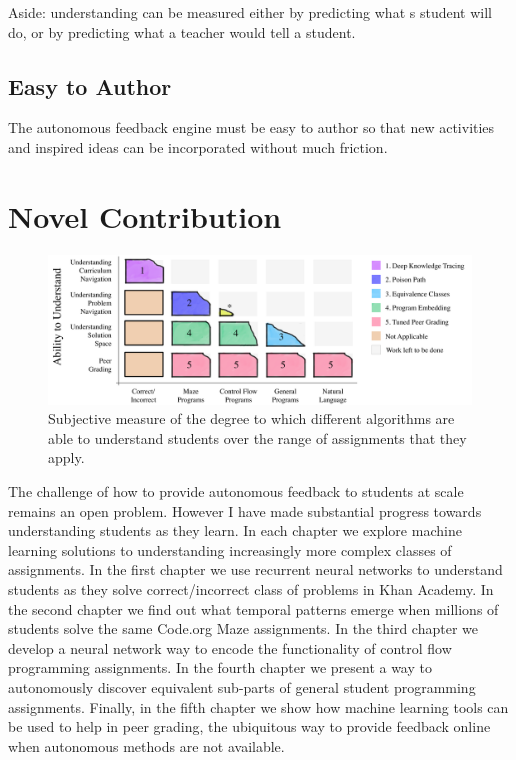 Aside: understanding can be measured either by predicting what s student will do, or by predicting what a teacher would tell a student.

\subsection{Easy to Author}

The autonomous feedback engine must be easy to author so that new activities and inspired ideas can be incorporated without much friction.

\section{Novel Contribution}

\begin{figure}[h]
\center
   \includegraphics[width=1.0\textwidth]{img/intro-blocks.pdf}
\caption[Subjective contribution overview]{
Subjective measure of the degree to which different algorithms are able to understand students over the range of assignments that they apply.}
\label{fig:bigPicture}

\end{figure}

The challenge of how to provide autonomous feedback to students at scale remains an open problem. However I have made substantial progress towards understanding students as they learn. In each chapter we explore machine learning solutions to understanding increasingly more complex classes of assignments. 
In the first chapter we use recurrent neural networks to understand students as they solve correct/incorrect class of problems in Khan Academy. In the second chapter we find out what temporal patterns emerge when millions of students solve the same Code.org Maze assignments. In the third chapter we develop a neural network way to encode the functionality of control flow programming assignments. In the fourth chapter we present a way to autonomously discover equivalent sub-parts of general student programming assignments. Finally, in the fifth chapter we show how machine learning tools can be used to help in peer grading, the ubiquitous way to provide feedback online when autonomous methods are not available.

